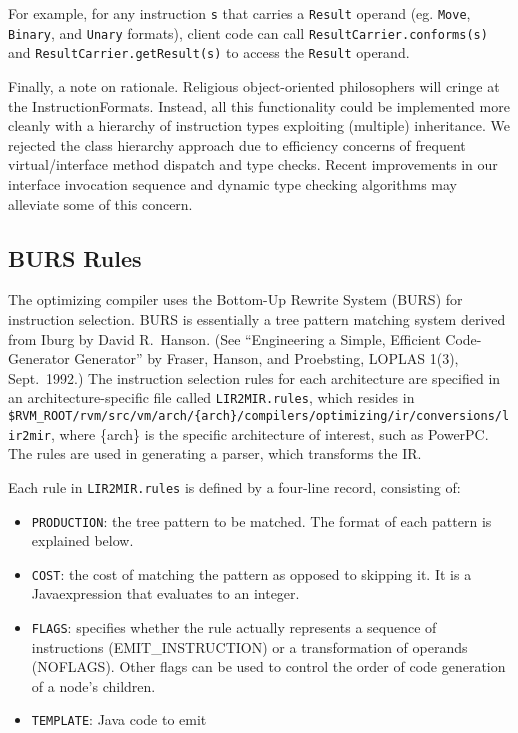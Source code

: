 For example, for any instruction {\tt s} that carries a {\tt Result} operand
(eg. {\tt Move}, {\tt Binary}, and {\tt Unary} formats), client code can call
{\tt ResultCarrier.conforms(s)} and {\tt ResultCarrier.getResult(s)} to access
the {\tt Result} operand.

Finally, a note on rationale.  Religious object-oriented philosophers
will cringe at the InstructionFormats.  Instead, all this
functionality could be implemented more cleanly with a hierarchy of
instruction types exploiting (multiple) inheritance.  We rejected the
class hierarchy approach due to efficiency concerns of frequent
virtual/interface method dispatch and type checks.  Recent
improvements in our interface invocation sequence and dynamic type
checking algorithms may alleviate some of this concern.

\subsection{BURS Rules}\label{burs}

The optimizing compiler uses the Bottom-Up Rewrite System (BURS) for
instruction selection.  BURS is essentially a tree pattern matching
system derived from Iburg by David R.\ Hanson.   (See ``Engineering a
Simple, Efficient Code-Generator Generator'' by Fraser, Hanson, and
Proebsting, LOPLAS 1(3), Sept.\ 1992.)
The instruction selection rules for each architecture are specified in an
architecture-specific file called {\tt LIR2MIR.rules}, which resides in
{\tt \$RVM\_ROOT/rvm/src/vm/arch/\{arch\}/compilers/optimizing/ir/conversions/lir2mir}, where \{arch\} is the
specific architecture of interest, such as PowerPC\PowerPCTMFootnote.
The rules are 
used in generating a parser, which transforms the IR.

Each rule in {\tt LIR2MIR.rules} is defined by a four-line record,
consisting of:
\begin{itemize}
\item {\tt PRODUCTION}: the tree pattern to be matched.  The format of each
pattern is explained below.
\item {\tt COST}: the cost of matching the pattern as opposed to skipping
it.  It is a Java\trademark expression that evaluates to an integer.
\item {\tt FLAGS}: specifies whether the rule actually represents a sequence
of instructions (EMIT\_INSTRUCTION) or a transformation of operands
(NOFLAGS). Other flags can be used to control the order of code
generation of a node's children.
\item {\tt TEMPLATE}: Java code to emit
\end{itemize}

